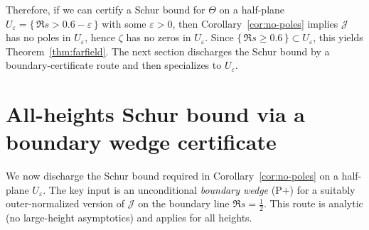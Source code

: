 \documentclass[11pt]{amsart}
\theoremstyle{definition}
\theoremstyle{remark}
\begin{document}
Therefore, if we can certify a Schur bound for $\Theta$ on a half-plane
$U_\varepsilon=\{\,\Re s>0.6-\varepsilon\,\}$ with some $\varepsilon>0$, then Corollary~\ref{cor:no-poles} implies
$\mathcal J$ has no poles in $U_\varepsilon$, hence $\zeta$ has no zeros in $U_\varepsilon$.
Since $\{\,\Re s\ge 0.6\,\}\subset U_\varepsilon$, this yields Theorem~\ref{thm:farfield}.
The next section discharges the Schur bound by a boundary-certificate route and then specializes to $U_\varepsilon$.
\section{All-heights Schur bound via a boundary wedge certificate}\label{sec:hybrid}
We now discharge the Schur bound required in Corollary~\ref{cor:no-poles} on a half-plane $U_\varepsilon$.
The key input is an unconditional \emph{boundary wedge} \textup{(P+)} for a suitably outer-normalized version of $\mathcal J$
on the boundary line $\Re s=\tfrac12$. This route is analytic (no large-height asymptotics) and applies for all heights.
\end{document}
